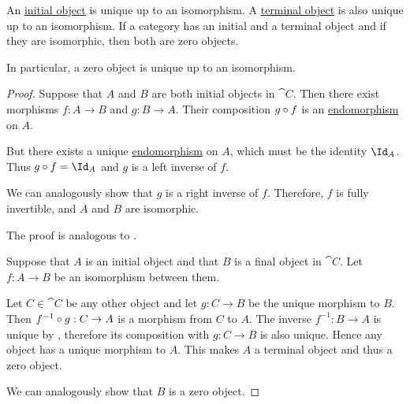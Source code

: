 \begin{proposition}\label{thm:zero_object_properties}
  \hfill
  \begin{thmenum}
     An \hyperref[def:zero_objects/initial]{initial object} is unique up to an isomorphism.
     A \hyperref[def:zero_objects/initial]{terminal object} is also unique up to an isomorphism.
     If a category has an initial and a terminal object and if they are isomorphic, then both are zero objects.

    In particular, a zero object is unique up to an isomorphism.
  \end{thmenum}
\end{proposition}
\begin{proof}
   Suppose that \( A \) and \( B \) are both initial objects in \( \cat{C} \). Then there exist morphisms \( f: A \to B \) and \( g: B \to A \). Their composition \( g \mathbin \circ f \) is an \hyperref[def:morphism_invertibility/endomorphism]{endomorphism} on \( A \).

  But there exists a unique \hyperref[def:morphism_invertibility/endomorphism]{endomorphism} on \( A \), which must be the identity \( \Id_A \). Thus \( g \bincirc f = \Id_A \) and \( g \) is a left inverse of \( f \).

  We can analogously show that \( g \) is a right inverse of \( f \). Therefore, \( f \) is fully invertible, and \( A \) and \( B \) are isomorphic.

   The proof is analogous to .

   Suppose that \( A \) is an initial object and that \( B \) is a final object in \( \cat{C} \). Let \( f: A \to B \) be an isomorphism between them.

  Let \( C \in \cat{C} \) be any other object and let \( g: C \to B \) be the unique morphism to \( B \). Then \( f^{-1} \mathbin \circ g: C \to A \) is a morphism from \( C \) to \( A \). The inverse \( f^{-1}: B \to A \) is unique by , therefore its composition with \( g: C \to B \) is also unique. Hence any object has a unique morphism to \( A \). This makes \( A \) a terminal object and thus a zero object.

  We can analogously show that \( B \) is a zero object.
\end{proof}

